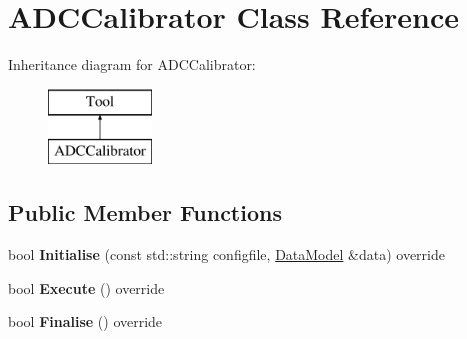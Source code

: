 \hypertarget{classADCCalibrator}{\section{A\-D\-C\-Calibrator Class Reference}
\label{classADCCalibrator}
}
Inheritance diagram for A\-D\-C\-Calibrator\-:\begin{figure}[H]
\begin{center}
\leavevmode
\includegraphics[height=2.000000cm]{classADCCalibrator}
\end{center}
\end{figure}
\subsection*{Public Member Functions}
\begin{DoxyCompactItemize}
\item 
\hypertarget{classADCCalibrator_af376d025b37e060119268c1e97eae714}{bool {\bfseries Initialise} (const std\-::string configfile, \hyperlink{classDataModel}{Data\-Model} \&data) override}\label{classADCCalibrator_af376d025b37e060119268c1e97eae714}

\item 
\hypertarget{classADCCalibrator_ac934901bc4c27eeffe0321bc0d2bf7bb}{bool {\bfseries Execute} () override}\label{classADCCalibrator_ac934901bc4c27eeffe0321bc0d2bf7bb}

\item 
\hypertarget{classADCCalibrator_a91ebec325155989f4116e1097cce95f8}{bool {\bfseries Finalise} () override}\label{classADCCalibrator_a91ebec325155989f4116e1097cce95f8}

\end{DoxyCompactItemize}
